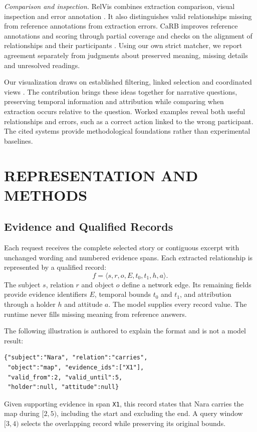 \documentclass[a4paper,twoside]{article}
\begin{document}
\emph{Comparison and inspection.} RelVis combines extraction comparison, visual inspection and error annotation \cite{schneider2017}. It also distinguishes valid relationships missing from reference annotations from extraction errors. CaRB improves reference annotations and scoring through partial coverage and checks on the alignment of relationships and their participants \cite{bhardwaj2019}. Using our own strict matcher, we report agreement separately from judgments about preserved meaning, missing details and unresolved readings.

Our visualization draws on established filtering, linked selection and coordinated views \cite{heer2012}. The contribution brings these ideas together for narrative questions, preserving temporal information and attribution while comparing when extraction occurs relative to the question. Worked examples reveal both useful relationships and errors, such as a correct action linked to the wrong participant. The cited systems provide methodological foundations rather than experimental baselines.



\section{\uppercase{Representation and Methods}}


\subsection{Evidence and Qualified Records}
\noindent Each request receives the complete selected story or contiguous excerpt with unchanged wording and numbered evidence spans. Each extracted relationship is represented by a qualified record:
\begin{equation}
\label{eq:qualified-record}
f = \langle s, r, o, E, t_0, t_1, h, a \rangle .
\end{equation}
The subject $s$, relation $r$ and object $o$ define a network edge. Its remaining fields provide evidence identifiers $E$, temporal bounds $t_0$ and $t_1$, and attribution through a holder $h$ and attitude $a$. The model supplies every record value. The runtime never fills missing meaning from reference answers.

The following illustration is authored to explain the format and is not a model result:
\begin{small}\begin{verbatim}
{"subject":"Nara", "relation":"carries",
 "object":"map", "evidence_ids":["X1"],
 "valid_from":2, "valid_until":5,
 "holder":null, "attitude":null}
\end{verbatim}\end{small}
Given supporting evidence in span \texttt{X1}, this record states that Nara carries the map during $[2,5)$, including the start and excluding the end. A query window $[3,4)$ selects the overlapping record while preserving its original bounds.
\end{document}

